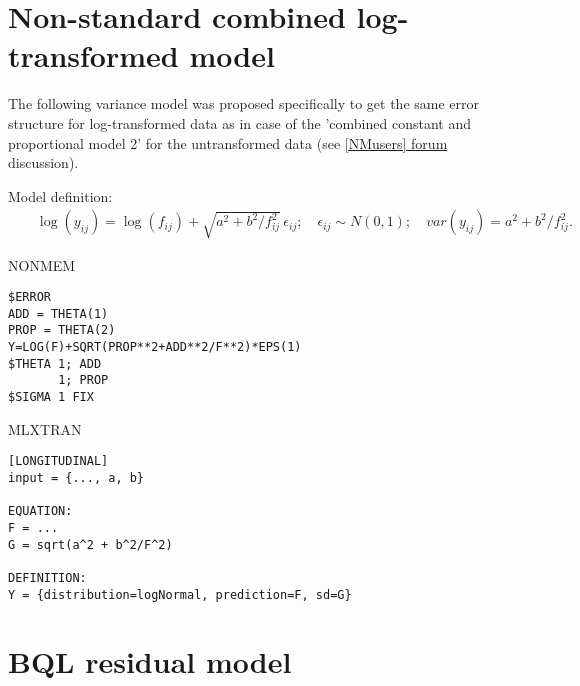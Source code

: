 \section{Non-standard combined log-transformed model} 

The following variance model was proposed 
specifically to get the same error structure for log-transformed data as 
in case of the 'combined constant and proportional model 2' for the 
untransformed data (see
\href{http://www.cognigencorp.com/nonmem/nm/99apr232002.html}{[NMusers] forum} discussion).

\bigskip
Model definition:
\begin{eqnarray}
&& \log(y_{ij}) = \log(f_{ij}) + \sqrt{a^2 + b^2/f_{ij}^2}\,\epsilon_{ij}; \quad \epsilon_{ij} \sim N(0,1); \quad \mathit{var}(y_{ij}) = a^2 + b^2/f_{ij}^2. \nonumber
\end{eqnarray}

\bigskip
\begin{lrbox}{\lstbox}\begin{minipage}{16cm}
NONMEM 
\begin{lstlisting}[frame=single,language=NM]
$ERROR
ADD = THETA(1)
PROP = THETA(2)
Y=LOG(F)+SQRT(PROP**2+ADD**2/F**2)*EPS(1)
$THETA 1; ADD
	   1; PROP
$SIGMA 1 FIX
\end{lstlisting}   
\end{minipage}\end{lrbox}
\usebox\lstbox


\begin{lrbox}{\lstbox}\begin{minipage}{16cm}
MLXTRAN
\begin{lstlisting}[frame=single,language=MLX]
[LONGITUDINAL]
input = {..., a, b}

EQUATION:
F = ...
G = sqrt(a^2 + b^2/F^2)

DEFINITION:
Y = {distribution=logNormal, prediction=F, sd=G}
\end{lstlisting}   
\end{minipage}\end{lrbox}
\usebox\lstbox


\section{BQL residual model} 

